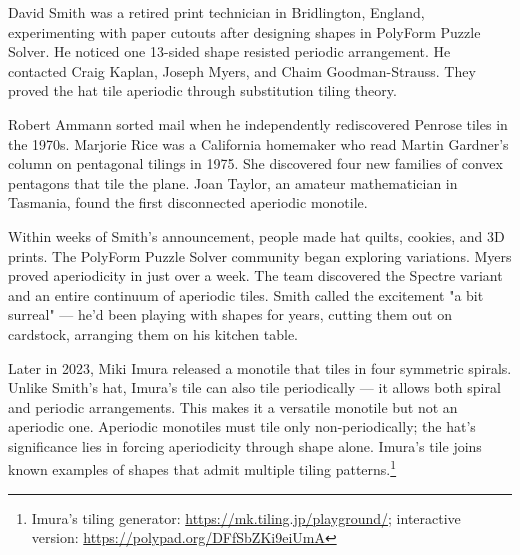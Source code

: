 \begin{commentary}
David Smith was a retired print technician in Bridlington, England, experimenting with paper cutouts after designing shapes in PolyForm Puzzle Solver. He noticed one 13-sided shape resisted periodic arrangement. He contacted Craig Kaplan, Joseph Myers, and Chaim Goodman-Strauss. They proved the hat tile aperiodic through substitution tiling theory.

Robert Ammann sorted mail when he independently rediscovered Penrose tiles in the 1970s. Marjorie Rice was a California homemaker who read Martin Gardner's column on pentagonal tilings in 1975. She discovered four new families of convex pentagons that tile the plane. Joan Taylor, an amateur mathematician in Tasmania, found the first disconnected aperiodic monotile.

Within weeks of Smith's announcement, people made hat quilts, cookies, and 3D prints. The PolyForm Puzzle Solver community began exploring variations. Myers proved aperiodicity in just over a week. The team discovered the Spectre variant and an entire continuum of aperiodic tiles. Smith called the excitement "a bit surreal" — he'd been playing with shapes for years, cutting them out on cardstock, arranging them on his kitchen table. 

Later in 2023, Miki Imura released a monotile that tiles in four symmetric spirals. Unlike Smith's hat, Imura's tile can also tile periodically — it allows both spiral and periodic arrangements. This makes it a versatile monotile but not an aperiodic one. Aperiodic monotiles must tile only non-periodically; the hat's significance lies in forcing aperiodicity through shape alone. Imura's tile joins known examples of shapes that admit multiple tiling patterns.\footnote{Imura's tiling generator: \url{https://mk.tiling.jp/playground/}; interactive version: \url{https://polypad.org/DFfSbZKi9eiUmA}}

\end{commentary}

